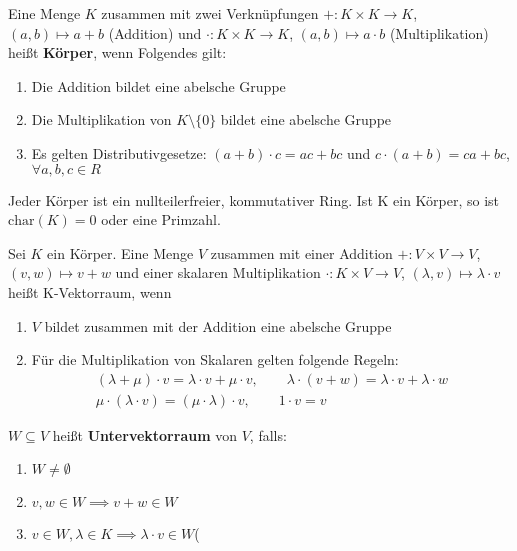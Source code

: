 \documentclass[8pt, a4paper, twocolumn, landscape]{article}
\begin{document}
\begin{definition}
Eine Menge $K$ zusammen mit zwei Verknüpfungen 
$+ : K \times K \to K$, $(a,b) \mapsto a + b$ (Addition) und
$\cdot : K \times K \to K$, $(a,b) \mapsto a \cdot b$ (Multiplikation)
 heißt \textbf{Körper}, wenn Folgendes gilt:
\begin{enumerate}
\item Die Addition bildet eine abelsche Gruppe
\item Die Multiplikation von $K\setminus \{0\} $ bildet eine abelsche Gruppe
\item Es gelten Distributivgesetze: $ (a+b)\cdot c = ac + bc $ und $ c\cdot(a+b) = ca + bc$, $\forall a,b,c \in R$
\end{enumerate}
Jeder Körper ist ein nullteilerfreier, kommutativer Ring. Ist K ein Körper, so ist $\mathrm{char}(K) = 0$ oder eine Primzahl.
\end{definition}

\begin{definition}
Sei $K$ ein Körper. Eine Menge $V$ zusammen mit einer Addition $ + : V \times V \to V $, $(v,w) \mapsto v + w$ und einer skalaren Multiplikation  $\cdot : K \times V \to V $, $(\lambda, v) \mapsto \lambda \cdot v$ 
heißt K-Vektorraum, wenn 
\begin{enumerate}
\item $V$ bildet zusammen mit der Addition eine abelsche Gruppe
\item Für die Multiplikation von Skalaren gelten folgende Regeln:
\begin{gather*}
(\lambda + \mu) \cdot v = \lambda\cdot v + \mu\cdot v, \qquad
\lambda \cdot (v+w) = \lambda \cdot v + \lambda \cdot w \\
\mu \cdot (\lambda\cdot v) = (\mu\cdot\lambda)\cdot v, \qquad
1\cdot v = v
\end{gather*}
\end{enumerate}
\end{definition}

\begin{definition}
$W \subseteq V$ heißt \textbf{Untervektorraum} von $V$, falls:
\begin{enumerate}
\item $W \neq \emptyset$
\item $v, w \in W \implies v+w \in W$ 
\item $v \in W, \lambda \in K \implies \lambda\cdot v \in W$(
\end{enumerate}
\end{definition}
\end{document}
